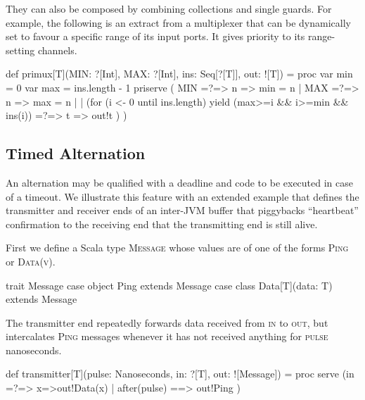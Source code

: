 \documentclass[12pt]{IOS-Book-Article-CPA-2017}
\begin{document}
They can also be composed by combining collections and single guards. For example,
the following is an extract from a multiplexer that can be
dynamically set to favour a specific range of its input ports.
It gives priority to its range-setting channels.
\begin{code*}[minmax.scala]
import ox.CSO._
object minmax
{ 
\end{code*}
\begin{code}
  def primux[T](MIN: ?[Int], MAX: ?[Int], ins: Seq[?[T]], out: ![T]) = 
  proc
  { var min = 0
    var max = ins.length - 1
    priserve ( MIN =?=> { n => min = n }
             | MAX =?=> { n => max = n }
             | | (for (i <- 0 until ins.length) yield 
                    (max>=i && i>=min && ins(i)) =?=> { t => out!t } )
             ) 
  }
\end{code}
\begin{code*}[]
}
\end{code*}



\subsection{Timed Alternation}
\label{Timed Alternation}
An alternation may be qualified with a deadline and code to be
executed in case of a timeout. We illustrate this feature
with an extended example that defines the transmitter and receiver
ends of an inter-JVM buffer that piggybacks ``heartbeat'' confirmation
to the receiving end that the transmitting end is still alive.

First we define a Scala type \textsc{Message} whose values are of one
of the forms \textsc{Ping} or \textsc{Data(v)}. 
\begin{code}
trait Message
case  object  Ping             extends Message {}
case  class   Data[T](data: T) extends Message {}
\end{code}

The transmitter end repeatedly forwards data received from \textsc{in}
to \textsc{out}, but intercalates \textsc{Ping} messages whenever
it has not received anything for \textsc{pulse} nanoseconds.
\begin{code}
def transmitter[T](pulse: Nanoseconds, in: ?[T], out: ![Message]) = 
  proc 
  { serve (in =?=> {x=>out!Data(x)} | after(pulse) ==> { out!Ping }) } 
\end{code}
\end{document}
